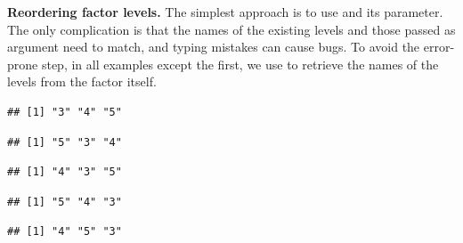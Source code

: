 \documentclass[krantz2]{krantz}\usepackage{knitr}%
\begin{document}
\begin{explainbox}
\textbf{Reordering factor levels.} The simplest approach is to use  and its  parameter. The only complication is that the names of the existing levels and those passed as argument need to match, and typing mistakes can cause bugs. To avoid the error-prone step, in all examples except the first, we use  to retrieve the names of the levels from the factor itself.

\begin{knitrout}\footnotesize
{}\color{fgcolor}\begin{kframe}
\begin{alltt}
\end{alltt}
\begin{verbatim}
## [1] "3" "4" "5"
\end{verbatim}
\begin{alltt}
 \hlkwb{<-}   \hlstd{=} \hlstd{(}\hlstd{,} \hlstd{,} \hlstd{))}
\end{alltt}
\begin{verbatim}
## [1] "5" "3" "4"
\end{verbatim}
\begin{alltt}
 \hlkwb{<-}   \hlstd{=} \hlstd{(}
\end{alltt}
\begin{verbatim}
## [1] "4" "3" "5"
\end{verbatim}
\begin{alltt}
 \hlkwb{<-}   \hlstd{=} \hlstd{(}  \hlstd{=} \hlstd{))}
\end{alltt}
\begin{verbatim}
## [1] "5" "4" "3"
\end{verbatim}
\begin{alltt}
 \hlkwb{<-}   \hlstd{=} \hlstd{(my.factor2)[}\hlstd{(}\hlstd{,} \hlstd{,} \hlstd{)])}
\end{alltt}
\begin{verbatim}
## [1] "4" "5" "3"
\end{verbatim}
\end{kframe}
\end{knitrout}


\end{explainbox}
\end{document}
